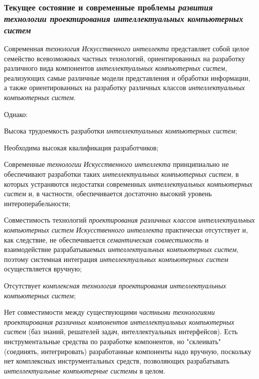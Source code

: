 \subsubsection{Текущее состояние и современные проблемы \textbf{\textit{развития}} \textbf{\textit{технологии проектирования интеллектуальных компьютерных систем}}}

Современная \textit{технология} \textit{Искусственного интеллекта} представляет собой целое семейство всевозможных частных технологий, ориентированных на разработку различного вида компонентов \textit{интеллектуальных компьютерных систем,} реализующих самые различные модели представления и обработки информации, а также ориентированных на разработку различных классов \textit{интеллектуальных компьютерных систем}.

Однако:

\begin{textitemize}
	\item
	Высока трудоемкость разработки \textit{интеллектуальных компьютерных систем};
	\item
	Необходима высокая квалификация разработчиков;
	\item
	Современные \textit{технологии} \textit{Искусственного интеллекта} принципиально не обеспечивают разработки таких \textit{интеллектуальных компьютерных систем,} в которых устраняются недостатки современных \textit{интеллектуальных компьютерных систем} и, в частности, обеспечивается достаточно высокий уровень интероперабельности;
	\item
	Совместимость технологий \textit{проектирования различных классов интеллектуальных компьютерных систем} \textit{Искусственного интеллекта} практически отсутствует и, как следствие, не обеспечивается \textit{семантическая совместимость} и взаимодействие разрабатываемых \textit{интеллектуальных компьютерных систем}, поэтому системная интеграция \textit{интеллектуальных компьютерных систем} осуществляется вручную;
	\item
	Отсутствует \textit{комплексная технология проектирования} \textit{интеллектуальных компьютерных систем};
	\item
	Нет совместимости между существующими \textit{частными технологиями проектирования различных компонентов интеллектуальных компьютерных систем} (баз знаний, решателей задач, интеллектуальных интерфейсов). Есть инструментальные средства по разработке компонентов, но "склеивать" (соединять, интегрировать) разработанные компоненты надо вручную, поскольку нет комплексных инструментальных средств, позволяющих разрабатывать \textit{интеллектуальные компьютерные системы} в целом.
\end{textitemize}

